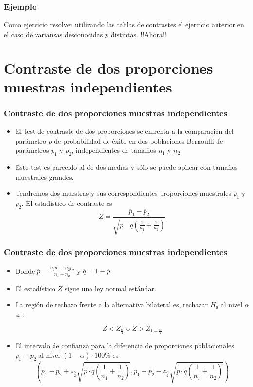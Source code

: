 \begin{frame}
\frametitle{Ejemplo}

Como ejercicio resolver  utilizando las tablas de contrastes el  ejercicio anterior en el caso de varianzas desconocidas y distintas.
!!Ahora!!
\end{frame}

\section{Contraste de dos proporciones muestras independientes}


\begin{frame}
\frametitle{Contraste de dos proporciones muestras independientes}
\begin{itemize}
\item El test de contraste de dos proporciones se enfrenta a la comparación del parámetro $p$ de probabilidad de éxito en dos poblaciones Bernoulli de parámetros $p_1$ y $p_2$, independientes de tamaños $n_1$ y $n_2$.
\item Este test es parecido al de dos medias y sólo se puede aplicar con tamaños muestrales grandes.
\item Tendremos dos muestras y sus correspondientes proporciones muestrales $\overline{p}_1$ y $\overline{p}_2$. El estadístico de contraste es 
$$Z=\frac{\overline{p}_1 -\overline{p}_2}{
\sqrt{\overline{p}\quad\overline{q}\left(\frac{1}{n_1}+\frac{1}{n_2}\right)}}$$
\end{itemize}
\end{frame}

\begin{frame}
\frametitle{Contraste de dos proporciones muestras independientes}
\begin{itemize}
\item Donde $\overline{p}=\frac{n_1 \overline{p}_1 +n_2 \overline{p}_2}{n_1 +n_2}$ y $\overline{q}=1-\overline{p}$
\item El estadístico $Z$ sigue una ley normal estándar.
\item La región de rechazo frente a la alternativa bilateral es, rechazar $H_0$ al nivel $\alpha$ si :

$$Z< Z_{\frac{\alpha}{2}}\mbox{ o } Z> Z_{1-\frac{\alpha}{2}}$$
\end{itemize}
\end{frame}

\begin{frame}
\begin{itemize}
\item El intervalo de confianza para la diferencia de proporciones poblacionales $p_1-p_2$
al nivel $(1-\alpha)\cdot 100\%$ es
$$ \left(\overline{p}_1-\overline{p_2}+z_{\frac{\alpha}{2}}\sqrt{\overline{p}\cdot 
 \overline{q}\left(\frac{1}{n_1}+\frac{1}{n_2}\right)},
 \overline{p}_1-\overline{p_2}-z_{\frac{\alpha}{2}}\sqrt{\overline{p}\cdot
 \overline{q}\left(\frac{1}{n_1}+\frac{1}{n_2}\right)}\right)
$$
\end{itemize}
\end{frame}

